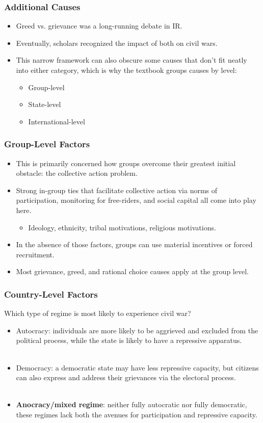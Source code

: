 \documentclass[handout]{beamer}
\begin{document}
\begin{frame} 
	\frametitle{\LARGE{Additional Causes}}
	\begin{itemize}
		\item Greed vs. grievance was a long-running debate in IR. \pause
		\item Eventually, scholars recognized the impact of both on civil wars. \pause
		\item This narrow framework can also obscure some causes that don't fit neatly into either category, which is why the textbook groups causes by level:
		\begin{itemize}
			\item Group-level
			\item State-level
			\item International-level
		\end{itemize} 
	\end{itemize}
\end{frame}

\begin{frame} 
\frametitle{\LARGE{Group-Level Factors}}
\begin{itemize}
		\item This is primarily concerned how groups overcome their greatest initial obstacle: the collective action problem. \pause
		\item Strong in-group ties that facilitate collective action via norms of participation, monitoring for free-riders, and social capital all come into play here. \pause
		\begin{itemize}
		\item Ideology, ethnicity, tribal motivations, religious motivations. \pause 
		\end{itemize}
		\item In the absence of those factors, groups can use material incentives or forced recruitment. \pause
		\item Most grievance, greed, and rational choice causes apply at the group level.		
\end{itemize}
\end{frame}

\begin{frame} 
\frametitle{\LARGE{Country-Level Factors}}
 Which type of regime is most likely to experience civil war?\pause
\begin{itemize}
		\item Autocracy: individuals are more likely to be aggrieved and excluded from the political process, while the state is likely to have a repressive apparatus. \pause
		\\~\\
		\item Democracy: a democratic state may have less repressive capacity, but citizens can also express and address their grievances via the electoral process. \pause 
		\\~\\
		\item \textbf{Anocracy/mixed regime}: neither fully autocratic nor fully democratic, these regimes lack both the avenues for participation and repressive capacity.
\end{itemize}
\end{frame}
\end{document}
